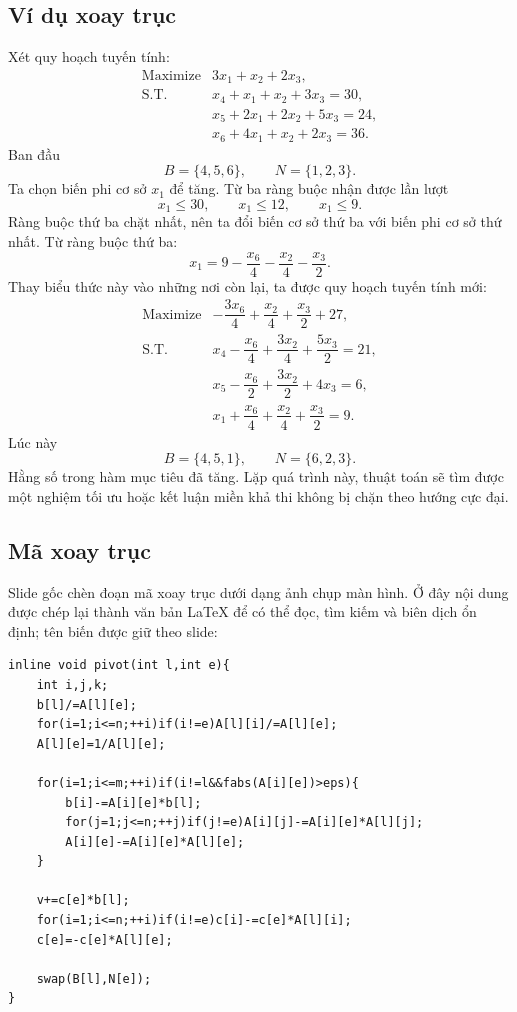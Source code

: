 \documentclass[11pt]{article}
\newcommand{\ST}{\text{S.T.}}
\begin{document}
\subsection{Ví dụ xoay trục}

Xét quy hoạch tuyến tính:
\[
\begin{array}{ll}
\text{Maximize} & 3x_1+x_2+2x_3,\\
\ST & x_4+x_1+x_2+3x_3=30,\\
    & x_5+2x_1+2x_2+5x_3=24,\\
    & x_6+4x_1+x_2+2x_3=36.
\end{array}
\]
Ban đầu
\[
  B=\{4,5,6\},\qquad N=\{1,2,3\}.
\]
Ta chọn biến phi cơ sở \(x_1\) để tăng. Từ ba ràng buộc nhận được lần lượt
\[
  x_1\le 30,\qquad x_1\le 12,\qquad x_1\le 9.
\]
Ràng buộc thứ ba chặt nhất, nên ta đổi biến cơ sở thứ ba với biến phi cơ sở
thứ nhất. Từ ràng buộc thứ ba:
\[
  x_1=9-\frac{x_6}{4}-\frac{x_2}{4}-\frac{x_3}{2}.
\]
Thay biểu thức này vào những nơi còn lại, ta được quy hoạch tuyến tính mới:
\[
\begin{array}{ll}
\text{Maximize} & -\dfrac{3x_6}{4}+\dfrac{x_2}{4}
                  +\dfrac{x_3}{2}+27,\\[0.5em]
\ST & x_4-\dfrac{x_6}{4}+\dfrac{3x_2}{4}
        +\dfrac{5x_3}{2}=21,\\[0.5em]
    & x_5-\dfrac{x_6}{2}+\dfrac{3x_2}{2}+4x_3=6,\\[0.5em]
    & x_1+\dfrac{x_6}{4}+\dfrac{x_2}{4}+\dfrac{x_3}{2}=9.
\end{array}
\]
Lúc này
\[
  B=\{4,5,1\},\qquad N=\{6,2,3\}.
\]
Hằng số trong hàm mục tiêu đã tăng. Lặp quá trình này, thuật toán sẽ tìm
được một nghiệm tối ưu hoặc kết luận miền khả thi không bị chặn theo hướng
cực đại.

\subsection{Mã xoay trục}

Slide gốc chèn đoạn mã xoay trục dưới dạng ảnh chụp màn hình. Ở đây nội dung
được chép lại thành văn bản LaTeX để có thể đọc, tìm kiếm và biên dịch ổn
định; tên biến được giữ theo slide:
\begin{verbatim}
inline void pivot(int l,int e){
    int i,j,k;
    b[l]/=A[l][e];
    for(i=1;i<=n;++i)if(i!=e)A[l][i]/=A[l][e];
    A[l][e]=1/A[l][e];

    for(i=1;i<=m;++i)if(i!=l&&fabs(A[i][e])>eps){
        b[i]-=A[i][e]*b[l];
        for(j=1;j<=n;++j)if(j!=e)A[i][j]-=A[i][e]*A[l][j];
        A[i][e]-=A[i][e]*A[l][e];
    }

    v+=c[e]*b[l];
    for(i=1;i<=n;++i)if(i!=e)c[i]-=c[e]*A[l][i];
    c[e]=-c[e]*A[l][e];

    swap(B[l],N[e]);
}
\end{verbatim}
\end{document}
